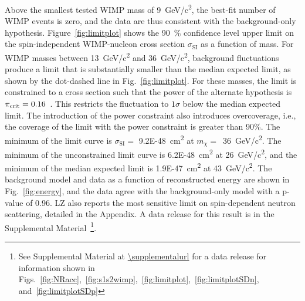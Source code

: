Above the smallest tested WIMP mass of \SI{9}{GeV/c\squared}, the best-fit number of WIMP events is zero, and the data are thus consistent with the background-only hypothesis.  Figure~\ref{fig:limitplot} shows the \SI{90}{\percent} confidence level upper limit on the spin-independent WIMP-nucleon cross section $\sigma_{\mathrm{SI}}$ as a function of mass. For WIMP masses between \SI{13}{GeV/c\squared} and \SI{36}{GeV/c\squared}, background fluctuations produce a limit that is substantially smaller than the median expected limit, as shown by the dot-dashed line in Fig.~\ref{fig:limitplot}. For these masses, the limit is constrained to a cross section such that the power of the alternate hypothesis is $\pi_{\rm crit}=0.16$~\cite{cowan2011power}.  This restricts the fluctuation to $1\sigma$ below the median expected limit. The introduction of the power constraint also introduces overcoverage, i.e., the coverage of the limit with the power constraint is greater than 90\%.
The minimum of the limit curve is $\sigma_{\mathrm{SI}}=$ \SI{9.2E-48}{cm\squared} at $m_{\chi}=$~\SI{36}{GeV/c\squared}. The minimum of the unconstrained limit curve is \SI{6.2E-48}{cm\squared} at \SI{26}{GeV/c\squared}, and the minimum of the median expected limit is \SI{1.9E-47}{cm\squared} at \SI{43}{GeV/c\squared}.
The background model and data as a function of reconstructed energy are shown in Fig.~\ref{fig:energy}, and the data agree with the background-only model with a p-value of 0.96. LZ also reports the most sensitive limit on spin-dependent neutron scattering, detailed in the Appendix. A data release for this result is in the Supplemental Material~\footnote{See Supplemental Material at \url{\supplementalurl} for a data release for information shown in Figs.~\ref{fig:NRacc},~\ref{fig:s1s2wimp},~\ref{fig:limitplot},~\ref{fig:limitplotSDn}, and~\ref{fig:limitplotSDp}}.


